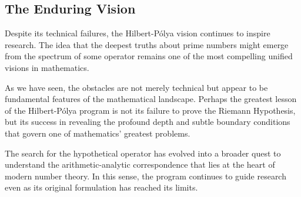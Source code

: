 \subsection{The Enduring Vision}

Despite its technical failures, the Hilbert-Pólya vision continues to inspire research. The idea that the deepest truths about prime numbers might emerge from the spectrum of some operator remains one of the most compelling unified visions in mathematics.

As we have seen, the obstacles are not merely technical but appear to be fundamental features of the mathematical landscape. Perhaps the greatest lesson of the Hilbert-Pólya program is not its failure to prove the Riemann Hypothesis, but its success in revealing the profound depth and subtle boundary conditions that govern one of mathematics' greatest problems.

The search for the hypothetical operator has evolved into a broader quest to understand the arithmetic-analytic correspondence that lies at the heart of modern number theory. In this sense, the program continues to guide research even as its original formulation has reached its limits.